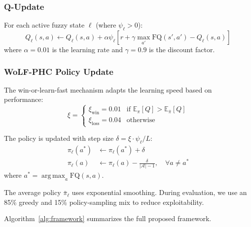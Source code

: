 \documentclass[journal,twocolumn]{IEEEtran}
\newcommand{\E}{\mathbb{E}}
\DeclareMathOperator*{\argmax}{arg\,max}
\begin{document}
\subsubsection{Q-Update}
For each active fuzzy state $\ell$ (where $\psi_\ell > 0$):
\begin{equation}
Q_\ell(s,a) \leftarrow Q_\ell(s,a) + \alpha\psi_\ell\left[r + \gamma\max_{a'}\text{FQ}(s',a') - Q_\ell(s,a)\right]
\label{eq:q_update}
\end{equation}
where $\alpha = 0.01$ is the learning rate and $\gamma = 0.9$ is the discount factor.

\subsubsection{WoLF-PHC Policy Update}
The win-or-learn-fast mechanism adapts the learning speed based on performance:
\begin{equation}
\xi = \begin{cases}
\xi_{\text{win}} = 0.01 & \text{if } \E_\pi[Q] > \E_{\bar{\pi}}[Q] \\
\xi_{\text{loss}} = 0.04 & \text{otherwise}
\end{cases}
\label{eq:wolf}
\end{equation}

The policy is updated with step size $\delta = \xi \cdot \psi_\ell / L$:
\begin{align}
\pi_\ell(a^*) &\leftarrow \pi_\ell(a^*) + \delta \\
\pi_\ell(a) &\leftarrow \pi_\ell(a) - \frac{\delta}{|\mathcal{A}|-1}, \quad \forall a \neq a^*
\label{eq:policy_update}
\end{align}
where $a^* = \argmax_a \text{FQ}(s,a)$.

The average policy $\bar{\pi}_\ell$ uses exponential smoothing. During evaluation, we use an 85\% greedy and 15\% policy-sampling mix to reduce exploitability.

Algorithm~\ref{alg:framework} summarizes the full proposed framework.
\end{document}
